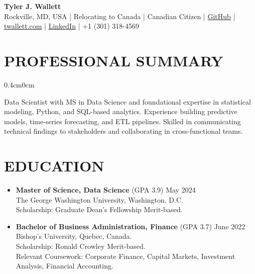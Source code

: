 \documentclass[a4paper,9pt]{extarticle}
\begin{document}
\thispagestyle{firstpage}

\begin{center}
\textbf{\Huge Tyler J. Wallett }\\[3pt] %
Rockville, MD, USA | Relocating to Canada | Canadian Citizen | \href{https://github.com/twallett}{GitHub} | \href{https://www.twallett.com}{twallett.com} | \href{https://www.linkedin.com/in/twallett/}{LinkedIn} | +1 (301) 318-4569  %
\end{center}

\section*{PROFESSIONAL SUMMARY}

\begin{adjustwidth}{0.4cm}{0cm}

Data Scientist with MS in Data Science and foundational expertise in statistical modeling, Python, and SQL-based analytics. Experience building predictive models, time-series forecasting, and ETL pipelines. Skilled in communicating technical findings to stakeholders and collaborating in cross-functional teams.

\end{adjustwidth}

\section*{EDUCATION}

\begin{itemize}[leftmargin=0.4cm, label={}]
    \item \textbf{Master of Science, Data Science} (GPA 3.9) \hfill May 2024 \\ 
    The George Washington University, Washington, D.C. \\ 
    Scholarship: Graduate Dean's Fellowship Merit-based.
\end{itemize}

\noindent
\begin{itemize}[leftmargin=0.4cm, label={}]
    \item \textbf{Bachelor of Business Administration, Finance} (GPA 3.7) \hfill June 2022 \\
    Bishop's University, Quebec, Canada. \\ 
    Scholarship: Ronald Crowley Merit-based. \\
    Relevant Coursework: Corporate Finance, Capital Markets, Investment Analysis, Financial Accounting.
\end{itemize}
\end{document}
